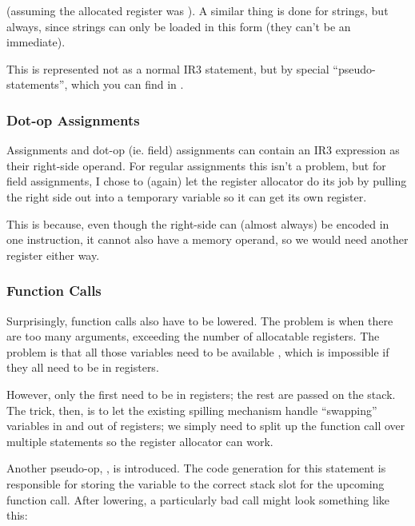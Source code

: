 \documentclass[12pt]{article}
\begin{document}
(assuming the allocated register was ). A similar thing is done for strings, but always, since strings can
only be loaded in this form (they can't be an immediate).

This is represented not as a normal IR3 statement, but by special \enquote{pseudo-statements}, which you can find in
.





\subsubsection{Dot-op Assignments}

Assignments and dot-op (ie. field) assignments can contain an IR3 expression as their right-side operand. For regular
assignments this isn't a problem, but for field assignments, I chose to (again) let the register allocator do its
job by pulling the right side out into a temporary variable so it can get its own register.

This is because, even though the right-side can (almost always) be encoded in one instruction, it cannot also have
a memory operand, so we would need another register either way.





\subsubsection{Function Calls}

Surprisingly, function calls also have to be lowered. The problem is when there are too many arguments, exceeding
the number of allocatable registers. The problem is that all those variables need to be available
, which is impossible if they all need to be in registers.

However, only the first  need to be in registers; the rest are passed on the stack. The trick, then,
is to let the existing spilling mechanism handle \enquote{swapping} variables in and out of registers; we simply
need to split up the function call over multiple statements so the register allocator can work.

Another pseudo-op, , is introduced. The code generation for this statement is responsible
for storing the variable to the correct stack slot for the upcoming function call. After lowering, a particularly bad
call might look something like this:
\end{document}
